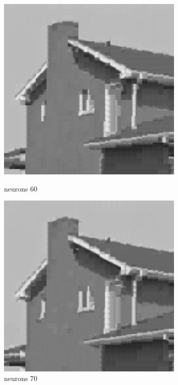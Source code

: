 \documentclass[../IDP_Task5_Karwowski_Kowalewski.tex]{subfiles}
\begin{document}
{{        \begin{figure}[!htbp]
            \begin{minipage}[c]{0.45\linewidth}
                \centering
                \includegraphics[width=0.8\textwidth]{img/kowalewski/crop_size_8_neurons_60.png}
                \caption{neurons 60}
            \end{minipage}\hfill
            \begin{minipage}[c]{0.45\linewidth}
                \centering
                \includegraphics[width=0.8\textwidth]{img/kowalewski/crop_size_8_neurons_70.png}
                \caption{neurons 70}
            \end{minipage}
        \end{figure}

}}
\end{document}
